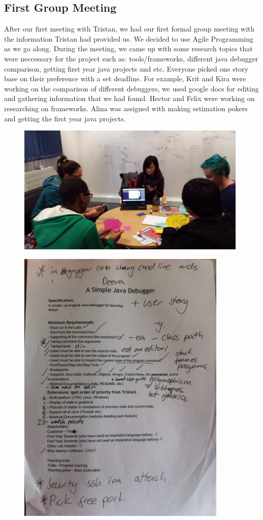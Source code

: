 \documentclass[11pt]{article}
\begin{document}
\subsection{First Group Meeting}
After our first meeting with Tristan, we had our first formal group meeting with the information Tristan had provided us. We decided to use Agile Programming as we go along. During the meeting, we came up with some research topics that were neccessary for the project such as: tools/frameworks, different java debugger comparison, getting first year java projects and etc. Everyone picked one story base on their preference with a set deadline. For example, Krit and Kira were working on the comparison of different debuggers, we used google docs for editing and gathering information that we had found. Hector and Felix were working on researching on frameworks. Alina was assigned with making estimation pokers and getting the first year java projects. 
\begin{figure}[h!]
\centering
\includegraphics[width=110mm]{estimation.jpg}
\end{figure}
\begin{figure}[h!]
\centering
\includegraphics[width=100mm]{UpdatedPlan.jpg}
\end{figure}
\end{document}
